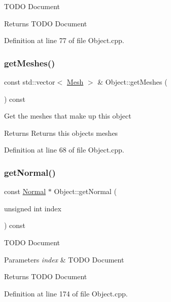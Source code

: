 T\+O\+DO Document \begin{DoxyReturn}{Returns}
T\+O\+DO Document 
\end{DoxyReturn}


Definition at line 77 of file Object.\+cpp.

\mbox{\label{class_object_a0c73a3e0bcadac01866e022cbe327082}} 
\subsubsection{\texorpdfstring{get\+Meshes()}{getMeshes()}}
{\footnotesize\ttfamily const std\+::vector$<$ \hyperlink{class_mesh}{Mesh} $>$ \& Object\+::get\+Meshes (\begin{DoxyParamCaption}{ }\end{DoxyParamCaption}) const}

Get the meshes that make up this object \begin{DoxyReturn}{Returns}
Returns this object\textquotesingle{}s meshes 
\end{DoxyReturn}


Definition at line 68 of file Object.\+cpp.

\mbox{\label{class_object_a096f8e6bd78d8f6d31b8897fad9b8e78}} 
\subsubsection{\texorpdfstring{get\+Normal()}{getNormal()}}
{\footnotesize\ttfamily const \hyperlink{struct_normal}{Normal} $\ast$ Object\+::get\+Normal (\begin{DoxyParamCaption}\item[{unsigned int}]{index }\end{DoxyParamCaption}) const}

T\+O\+DO Document 
\begin{DoxyParams}{Parameters}
{\em index} & T\+O\+DO Document \\
\hline
\end{DoxyParams}
\begin{DoxyReturn}{Returns}
T\+O\+DO Document 
\end{DoxyReturn}


Definition at line 174 of file Object.\+cpp.

